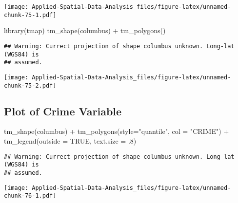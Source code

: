 \documentclass[
]{book}
\newenvironment{Shaded}{\begin{snugshade}}{\end{snugshade}}
\newcommand{\AttributeTok}[1]{\textcolor[rgb]{0.77,0.63,0.00}{#1}}
\newcommand{\ConstantTok}[1]{\textcolor[rgb]{0.00,0.00,0.00}{#1}}
\newcommand{\DecValTok}[1]{\textcolor[rgb]{0.00,0.00,0.81}{#1}}
\newcommand{\FunctionTok}[1]{\textcolor[rgb]{0.00,0.00,0.00}{#1}}
\newcommand{\NormalTok}[1]{#1}
\newcommand{\SpecialCharTok}[1]{\textcolor[rgb]{0.00,0.00,0.00}{#1}}
\newcommand{\StringTok}[1]{\textcolor[rgb]{0.31,0.60,0.02}{#1}}
\begin{document}
\begin{Shaded}
\end{Shaded}

\texttt{[image: Applied-Spatial-Data-Analysis\_files/figure-latex/unnamed-chunk-75-1.pdf]}

\begin{Shaded}
\begin{Highlighting}[]
\FunctionTok{library}\NormalTok{(tmap)}
\FunctionTok{tm\_shape}\NormalTok{(columbus) }\SpecialCharTok{+} \FunctionTok{tm\_polygons}\NormalTok{()}
\end{Highlighting}
\end{Shaded}

\begin{verbatim}
## Warning: Currect projection of shape columbus unknown. Long-lat (WGS84) is
## assumed.
\end{verbatim}

\texttt{[image: Applied-Spatial-Data-Analysis\_files/figure-latex/unnamed-chunk-75-2.pdf]}

\hypertarget{plot-of-crime-variable}{%
\subsection{Plot of Crime Variable}\label{plot-of-crime-variable}}

\begin{Shaded}
\begin{Highlighting}[]
\FunctionTok{tm\_shape}\NormalTok{(columbus) }\SpecialCharTok{+} \FunctionTok{tm\_polygons}\NormalTok{(}\AttributeTok{style=}\StringTok{"quantile"}\NormalTok{, }\AttributeTok{col =} \StringTok{"CRIME"}\NormalTok{) }\SpecialCharTok{+}
  \FunctionTok{tm\_legend}\NormalTok{(}\AttributeTok{outside =} \ConstantTok{TRUE}\NormalTok{, }\AttributeTok{text.size =}\NormalTok{ .}\DecValTok{8}\NormalTok{)}
\end{Highlighting}
\end{Shaded}

\begin{verbatim}
## Warning: Currect projection of shape columbus unknown. Long-lat (WGS84) is
## assumed.
\end{verbatim}

\texttt{[image: Applied-Spatial-Data-Analysis\_files/figure-latex/unnamed-chunk-76-1.pdf]}
\end{document}
